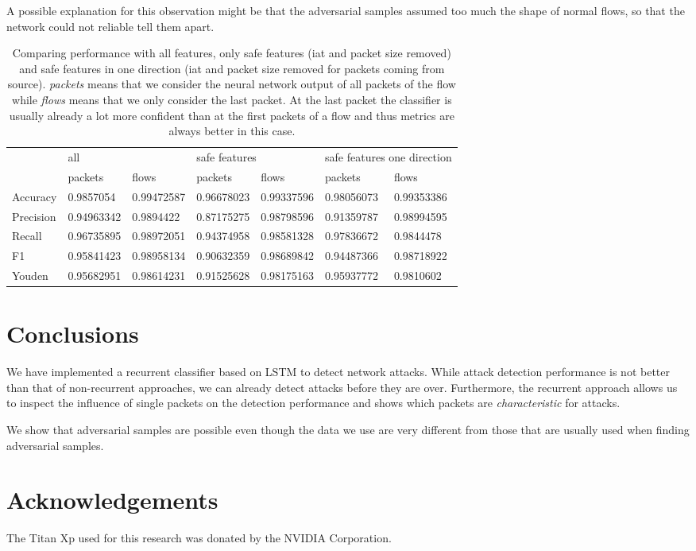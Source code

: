 \documentclass[conference]{IEEEtran}
\begin{document}
A possible explanation for this observation might be that the adversarial samples assumed too much the shape of normal flows, so that the network could not reliable tell them apart.

\begin{table}
\caption{Comparing performance with all features, only safe features (\gls{iat} and packet size removed) and safe features in one direction (\gls{iat} and packet size removed for packets coming from source). \textit{packets} means that we consider the neural network output of all packets of the flow while \textit{flows} means that we only consider the last packet. At the last packet the classifier is usually already a lot more confident than at the first packets of a flow and thus metrics are always better in this case.}  \label{tab:performance_results_no_manipulable}
\newcommand{\cmidrulespace}{6pt}
\centering
\begin{tabular}{l l l l l l l} \toprule
& \multicolumn{2}{l}{all} & \multicolumn{2}{l}{safe features} & \multicolumn{2}{l}{safe features one direction} \\
\cmidrule(r){2-3} \cmidrule(lr){4-5} \cmidrule(l){6-7}
& packets & flows & packets & flows & packets & flows \\
\midrule
Accuracy & 0.9857054 & 0.99472587 & 0.96678023 & 0.99337596 & 0.98056073 & 0.99353386 \\
Precision & 0.94963342 & 0.9894422 & 0.87175275 & 0.98798596 & 0.91359787 & 0.98994595 \\
Recall & 0.96735895 & 0.98972051 & 0.94374958 & 0.98581328 & 0.97836672 & 0.9844478 \\
F1 & 0.95841423 & 0.98958134 & 0.90632359 & 0.98689842 & 0.94487366 & 0.98718922 \\
Youden & 0.95682951 & 0.98614231 & 0.91525628 & 0.98175163 & 0.95937772 & 0.9810602 \\
\bottomrule
\end{tabular}
\end{table}


\section{Conclusions}

We have implemented a recurrent classifier based on LSTM to detect network attacks. While attack detection performance is not better than that of non-recurrent approaches, we can already detect attacks before they are over. Furthermore, the recurrent approach allows us to inspect the influence of single packets on the detection performance and shows which packets are \textit{characteristic} for attacks.

We show that adversarial samples are possible even though the data we use are very different from those that are usually used when finding adversarial samples.




\section*{Acknowledgements}
The Titan Xp used for this research was donated by the NVIDIA Corporation.
\end{document}
